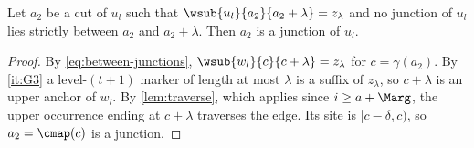 \begin{lemma}[Transfer]\label{lem:transfer}
Let $a_2$ be a cut of $u_l$ such that $\wsub{u_l}{a_2}{a_2+\lambda}=
z_\lambda$ and no junction of $u_l$ lies strictly between $a_2$ and
$a_2+\lambda$. Then $a_2$ is a junction of $u_l$.
\end{lemma}

\begin{proof}
By \eqref{eq:between-junctions}, $\wsub{w_l}{c}{c+\lambda}=z_\lambda$ for
$c=\gamma(a_2)$. By \ref{it:G3} a level-$(t+1)$ marker of length at most
$\lambda$ is a suffix of $z_\lambda$, so $c+\lambda$ is an upper anchor of
$w_l$. By \cref{lem:traverse}, which applies since $i\ge a+\Marg$, the upper
occurrence ending at $c+\lambda$ traverses the edge. Its site is
$[c-\delta,c)$, so $a_2=\cmap(c)$ is a junction.
\end{proof}

